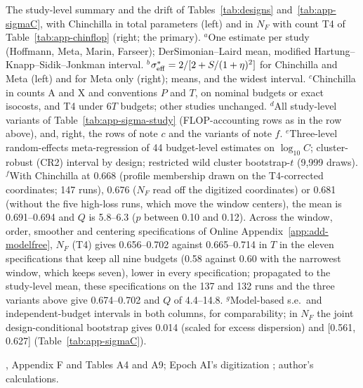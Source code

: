 \begin{table}[tp]
\begin{tablenotes}
The study-level summary and the drift of Tables~\ref{tab:designs} and~\ref{tab:app-sigmaC}, with Chinchilla in total parameters (left) and in $N_F$ with count T4 of Table~\ref{tab:app-chinflop} (right; the primary). $^{a}$One estimate per study (Hoffmann, Meta, Marin, Farseer); DerSimonian--Laird mean, modified Hartung--Knapp--Sidik--Jonkman interval. $^{b}$$\sigma^*_{\rm eff}=2/[2+S/(1+\eta)^2]$ for Chinchilla and Meta (left) and for Meta only (right); means, and the widest interval. $^{c}$Chinchilla in counts A and X and conventions $P$ and $T$, on nominal budgets or exact isocosts, and T4 under $6T$ budgets; other studies unchanged. $^{d}$All study-level variants of Table~\ref{tab:app-sigma-study} (FLOP-accounting rows as in the row above), and, right, the rows of note $c$ and the variants of note $f$. $^{e}$Three-level random-effects meta-regression of 44 budget-level estimates on $\log_{10}C$; cluster-robust (CR2) interval by design; restricted wild cluster bootstrap-$t$ (9,999 draws). $^{f}$With Chinchilla at 0.668 (profile membership drawn on the T4-corrected coordinates; 147 runs), 0.676 ($N_F$ read off the digitized coordinates) or 0.681 (without the five high-loss runs, which move the window centers), the mean is 0.691--0.694 and $Q$ is 5.8--6.3 ($p$ between 0.10 and 0.12). Across the window, order, smoother and centering specifications of Online Appendix~\ref{app:add-modelfree}, $N_F$ (T4) gives 0.656--0.702 against 0.665--0.714 in $T$ in the eleven specifications that keep all nine budgets (0.58 against 0.60 with the narrowest window, which keeps seven), lower in every specification; propagated to the study-level mean, these specifications on the 137 and 132 runs and the three variants above give 0.674--0.702 and $Q$ of 4.4--14.8. $^{g}$Model-based s.e.\ and independent-budget intervals in both columns, for comparability; in $N_F$ the joint design-conditional bootstrap gives 0.014 (scaled for excess dispersion) and [0.561, 0.627] (Table~\ref{tab:app-sigmaC}).
\end{tablenotes}

\begin{tablenotes}[Source]
\citet{hoffmann2022training}, Appendix F and Tables A4 and A9; Epoch AI's digitization \citep{besiroglu2024chinchilla}; author's calculations.
\end{tablenotes}
\end{table}
